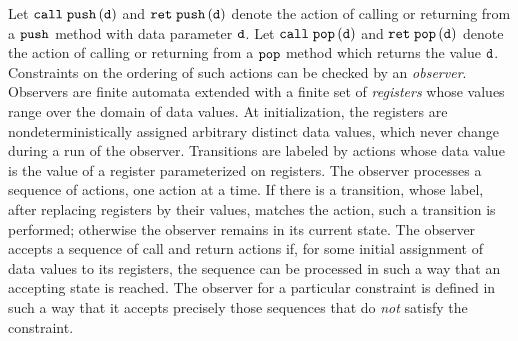 Let $\mathtt{call}\; \tt push\left(\tt d\right)$ and $\mathtt{ret}\; \tt push\left(\tt d\right)$ denote the
action of calling or returning from a ${\tt push}$ method with data parameter ${\tt d}$.
Let $\mathtt{call}\; \tt pop\left(\tt d\right)$ and $\mathtt{ret}\; \tt pop\left(\tt d\right)$ denote the
action of calling or returning from a ${\tt pop}$ method which returns
the value ${\tt d}$.
Constraints on the ordering of such actions can be
checked by an {\em observer}.
%
Observers are
finite automata extended with a finite set of {\em registers} whose values range
over the domain of data values.
%
At initialization,
the registers are nondeterministically
assigned arbitrary distinct data values, which never change
during a run of the observer. 
%
Transitions are labeled by actions whose data value
is the value of a register parameterized on registers.%
The observer processes a sequence of actions, one action at a time.
If there is a transition, whose label, after replacing registers by their
values, matches the action, such a transition is performed; otherwise
the observer remains in its current state.
%
The observer accepts a sequence of call and return actions
if, for some initial assignment of data values to its registers, the sequence
can  be processed in such a way that an accepting state is reached.
The observer for a particular constraint is defined in such a way that it
accepts precisely those sequences  that do {\em not} satisfy the constraint.


